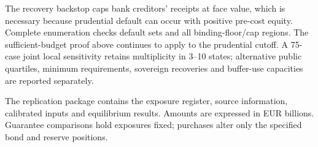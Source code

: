 The recovery backstop caps bank creditors' receipts at face value, which is necessary because prudential default can occur with positive pre-cost equity. Complete enumeration checks default sets and all binding-floor/cap regions. The sufficient-budget proof above continues to apply to the prudential cutoff. A 75-case joint local sensitivity retains multiplicity in 3--10 states; alternative public quartiles, minimum requirements, sovereign recoveries and buffer-use capacities are reported separately.

The replication package contains the exposure register, source information, calibrated inputs and equilibrium results. Amounts are expressed in EUR billions. Guarantee comparisons hold exposures fixed; purchases alter only the specified bond and reserve positions.
\FloatBarrier
